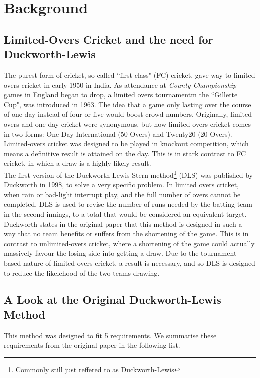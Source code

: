 \chapter{Background}

\section{Limited-Overs Cricket and the need for Duckworth-Lewis}
The purest form of cricket, so-called ``first class" (FC) cricket, gave way to limited overs cricket in early 1950 in India. As attendance at \textit{County Championship} games in England began to drop, a limited overs tournamentm the ``Gillette Cup", was introduced in 1963. The idea that a game only lasting over the course of one day instead of four or five would boost crowd numbers. Originally, limited-overs and one day cricket were synonymous, but now limited-overs cricket comes in two forms: One Day International (50 Overs) and Twenty20 (20 Overs). Limited-overs cricket was designed to be played in knockout competition, which means a definitive result is attained on the day. This is in stark contrast to FC cricket, in which a draw is a highly likely result. \\


The first version of the Duckworth-Lewis-Stern method\footnote{Commonly still just reffered to as Duckworth-Lewis} (DLS) was published by Duckworth \cite{duckworth} in 1998, to solve a very specific problem. In limited overs cricket, when rain or bad-light interrupt play, and the full number of overs cannot be completed, DLS is used to revise the number of runs needed by the batting team in the second innings, to a total that would be considered an equivalent target. Duckworth states in the original paper that this method is designed in such a way that no team benefits or suffers from the shortening of the game. This is in contrast to unlimited-overs cricket, where a shortening of the game could actually massively favour the losing side into getting a draw. Due to the tournament-based nature of limited-overs cricket, a result is necessary, and so DLS is designed to reduce the likelehood of the two teams drawing. \\

\section{A Look at the Original Duckworth-Lewis Method}
This method was designed to fit 5 requirements. We summarise these requirements from the original paper in the following list.

